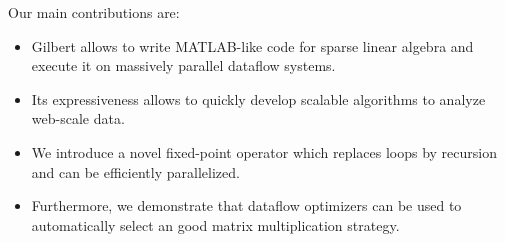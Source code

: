 Our main contributions are:
\begin{itemize}
 \item Gilbert allows to write MATLAB-like code for sparse linear algebra and execute it on massively parallel dataflow systems.
 \item Its expressiveness allows to quickly develop scalable algorithms to analyze web-scale data.
 \item We introduce a novel fixed-point operator which replaces loops by recursion and can be efficiently parallelized.
 \item Furthermore, we demonstrate that dataflow optimizers can be used to automatically select an good matrix multiplication strategy. 
\end{itemize}



